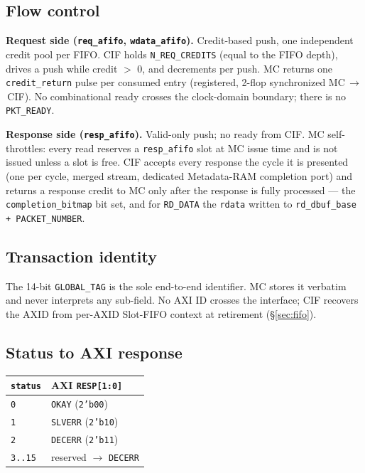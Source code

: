 \subsection{Flow control}

\textbf{Request side (\texttt{req\_afifo}, \texttt{wdata\_afifo}).}
Credit-based push, one independent credit pool per FIFO.  CIF holds
\texttt{N\_REQ\_CREDITS} (equal to the FIFO depth), drives a push while
credit $>$ 0, and decrements per push.  MC returns one \texttt{credit\_return}
pulse per consumed entry (registered, 2-flop synchronized MC\,$\to$\,CIF).
No combinational ready crosses the clock-domain boundary; there is no
\texttt{PKT\_READY}.

\textbf{Response side (\texttt{resp\_afifo}).}
Valid-only push; no ready from CIF.  MC self-throttles: every read reserves a
\texttt{resp\_afifo} slot at MC issue time and is not issued unless a slot is
free.  CIF accepts every response the cycle it is presented (one per cycle,
merged stream, dedicated Metadata-RAM completion port) and returns a response
credit to MC only after the response is fully processed --- the
\texttt{completion\_bitmap} bit set, and for \texttt{RD\_DATA} the
\texttt{rdata} written to \texttt{rd\_dbuf\_base + PACKET\_NUMBER}.

\subsection{Transaction identity}

The 14-bit \texttt{GLOBAL\_TAG} is the sole end-to-end identifier.  MC stores
it verbatim and never interprets any sub-field.  No AXI ID crosses the
interface; CIF recovers the AXID from per-AXID Slot-FIFO context at
retirement (\S\ref{sec:fifo}).

\subsection{Status to AXI response}

\begin{center}
\begin{tabular}{ll}
\toprule
\texttt{status} & AXI \texttt{RESP[1:0]}\\
\midrule
\texttt{0} & \texttt{OKAY} (\texttt{2'b00})\\
\texttt{1} & \texttt{SLVERR} (\texttt{2'b10})\\
\texttt{2} & \texttt{DECERR} (\texttt{2'b11})\\
\texttt{3..15} & reserved $\to$ \texttt{DECERR}\\
\bottomrule
\end{tabular}
\end{center}

